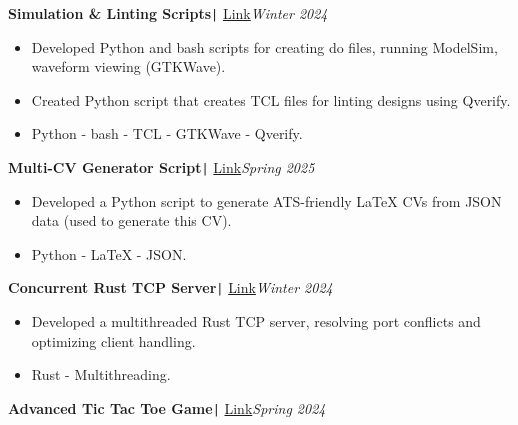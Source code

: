 \documentclass[11pt,a4paper]{article}
\begin{document}
\vspace{-0.3cm}
\begin{flushleft}
\textbf{Simulation \& Linting Scripts}\texttt{|} {\href{https://github.com/salah0eldin/Scripts}{Link}}\hfill\textit{Winter 2024}\\
\end{flushleft}
\vspace{-0.6cm}
\begin{itemize}
\item \setlength{\itemsep}{-0.0em} Developed Python and bash scripts for creating do files, running ModelSim, waveform viewing (GTKWave).
\item \setlength{\itemsep}{-0.0em} Created Python script that creates TCL files for linting designs using Qverify.
\item \setlength{\itemsep}{-0.0em} Python - bash - TCL - GTKWave - Qverify.
\end{itemize}
\vspace{-0.3cm}
\begin{flushleft}
\textbf{Multi-CV Generator Script}\texttt{|} {\href{https://github.com/salah0eldin/CV}{Link}}\hfill\textit{Spring 2025}\\
\end{flushleft}
\vspace{-0.6cm}
\begin{itemize}
\item \setlength{\itemsep}{-0.0em} Developed a Python script to generate ATS-friendly LaTeX CVs from JSON data (used to generate this CV).
\item \setlength{\itemsep}{-0.0em} Python - LaTeX - JSON.
\end{itemize}
\vspace{-0.3cm}
\begin{flushleft}
\textbf{Concurrent Rust TCP Server}\texttt{|} {\href{https://github.com/salah0eldin/RustTCPServer}{Link}}\hfill\textit{Winter 2024}\\
\end{flushleft}
\vspace{-0.6cm}
\begin{itemize}
\item \setlength{\itemsep}{-0.0em} Developed a multithreaded Rust TCP server, resolving port conflicts and optimizing client handling.
\item \setlength{\itemsep}{-0.0em} Rust - Multithreading.
\end{itemize}
\vspace{-0.3cm}
\begin{flushleft}
\textbf{Advanced Tic Tac Toe Game}\texttt{|} {\href{https://www.linkedin.com/posts/salah-eldin-hassen-5bba10250_qt-cplusplus-softwaredevelopment-activity-7227345922031009793-xhzd/?rcm=ACoAAD4WDF8Bk9P5oS-irdrlv53Rzjd03ps4OSA}{Link}}\hfill\textit{Spring 2024}\\
\end{flushleft}
\end{document}
